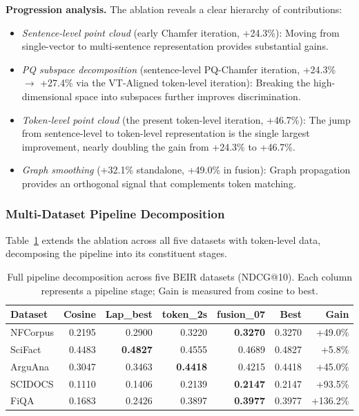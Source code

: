 \documentclass[review,1p]{elsarticle}
\begin{document}
\textbf{Progression analysis.} The ablation reveals a clear hierarchy of contributions:
\begin{itemize}[leftmargin=*]
\item \textit{Sentence-level point cloud} (early Chamfer iteration, +24.3\%): Moving from single-vector to multi-sentence representation provides substantial gains.
\item \textit{PQ subspace decomposition} (sentence-level PQ-Chamfer iteration, +24.3\% $\to$ +27.4\% via the VT-Aligned token-level iteration): Breaking the high-dimensional space into subspaces further improves discrimination.
\item \textit{Token-level point cloud} (the present token-level iteration, +46.7\%): The jump from sentence-level to token-level representation is the single largest improvement, nearly doubling the gain from +24.3\% to +46.7\%.
\item \textit{Graph smoothing} (+32.1\% standalone, +49.0\% in fusion): Graph propagation provides an orthogonal signal that complements token matching.
\end{itemize}

\subsubsection{Multi-Dataset Pipeline Decomposition}
\label{subsubsec:multi-dataset}

Table~\ref{tab:decomposition} extends the ablation across all five datasets with token-level data, decomposing the pipeline into its constituent stages.

\begin{table}[ht]
\centering
\caption{Full pipeline decomposition across five BEIR datasets (NDCG@10). Each column represents a pipeline stage; Gain is measured from cosine to best.}
\label{tab:decomposition}
\begin{tabular}{lrrrrr|r}
\toprule
Dataset & Cosine & Lap\_best & token\_2s & fusion\_07 & \textbf{Best} & \textbf{Gain} \\
\midrule
NFCorpus & 0.2195 & 0.2900 & 0.3220 & \textbf{0.3270} & 0.3270 & +49.0\% \\
SciFact & 0.4483 & \textbf{0.4827} & 0.4555 & 0.4689 & 0.4827 & +5.8\% \\
ArguAna & 0.3047 & 0.3463 & \textbf{0.4418} & 0.4215 & 0.4418 & +45.0\% \\
SCIDOCS & 0.1110 & 0.1406 & 0.2139 & \textbf{0.2147} & 0.2147 & +93.5\% \\
FiQA & 0.1683 & 0.2426 & 0.3897 & \textbf{0.3977} & 0.3977 & +136.2\% \\
\bottomrule
\end{tabular}
\end{table}
\end{document}
